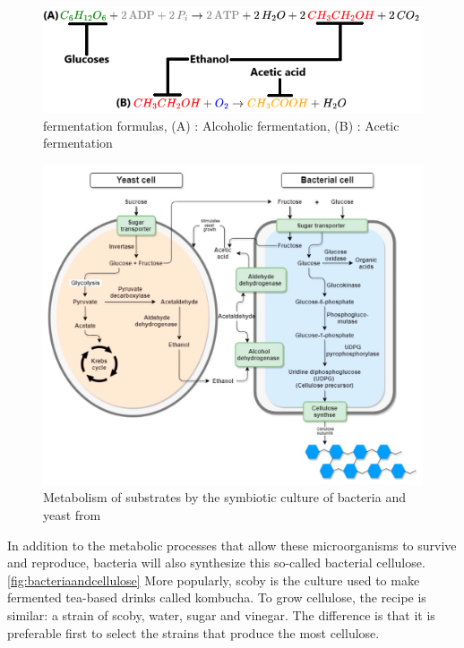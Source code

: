 
\begin{figure}[h]
    \centering
    \includegraphics{images/formule-chimique.png}
    \caption{fermentation formulas, (A) : Alcoholic fermentation, (B) : Acetic fermentation}
    \label{fig:fermentation formula}
\end{figure}

\begin{figure}[h]
    \centering
    \includegraphics{images/schema_metabolique.png}
    \caption{Metabolism of substrates by the symbiotic culture of bacteria and yeast from\cite{laavanya2021current}}
    \label{fig:metabolic}
\end{figure}

In addition to the metabolic processes that allow these microorganisms to survive and reproduce, bacteria will also synthesize this so-called bacterial cellulose.\ref{fig:bacteriaandcellulose} 
More popularly, scoby is the culture used to make fermented tea-based drinks called kombucha. 
To grow cellulose, the recipe is similar: a strain of scoby, water, sugar and vinegar. The difference is that it is preferable first to select the strains that produce the most cellulose. 

